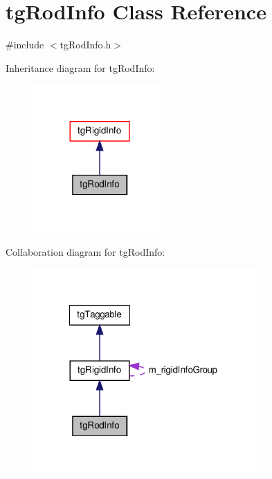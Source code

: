 \hypertarget{classtg_rod_info}{\section{tg\-Rod\-Info Class Reference}
\label{classtg_rod_info}
}


{\ttfamily \#include $<$tg\-Rod\-Info.\-h$>$}



Inheritance diagram for tg\-Rod\-Info\-:\nopagebreak
\begin{figure}[H]
\begin{center}
\leavevmode
\includegraphics[width=144pt]{classtg_rod_info__inherit__graph}
\end{center}
\end{figure}


Collaboration diagram for tg\-Rod\-Info\-:\nopagebreak
\begin{figure}[H]
\begin{center}
\leavevmode
\includegraphics[width=240pt]{classtg_rod_info__coll__graph}
\end{center}
\end{figure}
